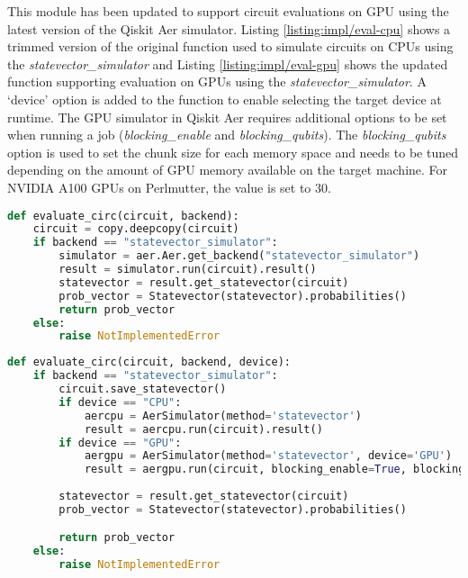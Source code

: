 This module has been updated to support circuit evaluations on GPU using the latest version of the Qiskit Aer simulator. Listing \ref{listing:impl/eval-cpu} shows a trimmed version of the original function used to simulate circuits on CPUs using the \textit{statevector\_simulator} and Listing \ref{listing:impl/eval-gpu} shows the updated function supporting evaluation on GPUs using the \textit{statevector\_simulator}. A `device' option is added to the function to enable selecting the target device at runtime. The GPU simulator in Qiskit Aer requires additional options to be set when running a job (\textit{blocking\_enable} and \textit{blocking\_qubits}). The \textit{blocking\_qubits} option is used to set the chunk size for each memory space and needs to be tuned depending on the amount of GPU memory available on the target machine. For NVIDIA A100 GPUs on Perlmutter, the value is set to 30.

\vspace{\baselineskip}
\begin{lstlisting}[caption={ Original function to evaluate circuits using the \textit{statevector\_simulator} method on CPUs. (Source: CutQC Framework \cite{cutqc}) },
label={listing:impl/eval-cpu},
language=Python,
float]
def evaluate_circ(circuit, backend):
    circuit = copy.deepcopy(circuit)
    if backend == "statevector_simulator":
        simulator = aer.Aer.get_backend("statevector_simulator")
        result = simulator.run(circuit).result()
        statevector = result.get_statevector(circuit)
        prob_vector = Statevector(statevector).probabilities()
        return prob_vector
    else:
        raise NotImplementedError
\end{lstlisting}

\vspace{\baselineskip}
\begin{lstlisting}[caption={ Updated function to evaluate circuits supporting evaluation on GPUs. The target device for simulation is selected based on the `device' argument passed to the function. },
label={listing:impl/eval-gpu},
language=Python,
float]
def evaluate_circ(circuit, backend, device):
    if backend == "statevector_simulator":
        circuit.save_statevector()
        if device == "CPU":
            aercpu = AerSimulator(method='statevector')
            result = aercpu.run(circuit).result()
        if device == "GPU":
            aergpu = AerSimulator(method='statevector', device='GPU')
            result = aergpu.run(circuit, blocking_enable=True, blocking_qubits=30).result()
        
        statevector = result.get_statevector(circuit)
        prob_vector = Statevector(statevector).probabilities()

        return prob_vector
    else:
        raise NotImplementedError
\end{lstlisting}

